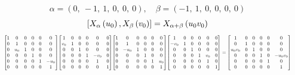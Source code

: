 \documentclass[11pt]{article}
\theoremstyle{definition}
\begin{document}
\[
\alpha = \left( 0, \  -1, \  1, \  0, \  0, \  0\right), \quad \beta = \left( -1, \  1, \  0, \  0, \  0, \  0\right)
\]
\[
\scaletoalign{\textwidth}{\left[ X_{\alpha}\left(u_{0}\right), X_{\beta}\left(v_{0}\right) \right] = X_{\alpha + \beta}\left(u_{0} v_{0}\right)}
\]
\[
\scaletoalign{\textwidth}{{\left[\begin{matrix}1 & 0 & 0 & 0 & 0 & 0\\0 & 1 & 0 & 0 & 0 & 0\\0 & u_{0} & 1 & 0 & 0 & 0\\0 & 0 & 0 & 1 & 0 & 0\\0 & 0 & 0 & 0 & 1 & - u_{0}\\0 & 0 & 0 & 0 & 0 & 1\end{matrix}\right]} {\left[\begin{matrix}1 & 0 & 0 & 0 & 0 & 0\\v_{0} & 1 & 0 & 0 & 0 & 0\\0 & 0 & 1 & 0 & 0 & 0\\0 & 0 & 0 & 1 & - v_{0} & 0\\0 & 0 & 0 & 0 & 1 & 0\\0 & 0 & 0 & 0 & 0 & 1\end{matrix}\right]} {\left[\begin{matrix}1 & 0 & 0 & 0 & 0 & 0\\0 & 1 & 0 & 0 & 0 & 0\\0 & - u_{0} & 1 & 0 & 0 & 0\\0 & 0 & 0 & 1 & 0 & 0\\0 & 0 & 0 & 0 & 1 & u_{0}\\0 & 0 & 0 & 0 & 0 & 1\end{matrix}\right]} {\left[\begin{matrix}1 & 0 & 0 & 0 & 0 & 0\\- v_{0} & 1 & 0 & 0 & 0 & 0\\0 & 0 & 1 & 0 & 0 & 0\\0 & 0 & 0 & 1 & v_{0} & 0\\0 & 0 & 0 & 0 & 1 & 0\\0 & 0 & 0 & 0 & 0 & 1\end{matrix}\right]} = {\left[\begin{matrix}1 & 0 & 0 & 0 & 0 & 0\\0 & 1 & 0 & 0 & 0 & 0\\u_{0} v_{0} & 0 & 1 & 0 & 0 & 0\\0 & 0 & 0 & 1 & 0 & - u_{0} v_{0}\\0 & 0 & 0 & 0 & 1 & 0\\0 & 0 & 0 & 0 & 0 & 1\end{matrix}\right]}}
\]
\end{document}
